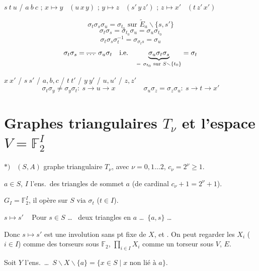 \documentclass[11pt,a4paper]{article}
\begin{document}
$s\ t\ u$ / $a\ b\ c$ ; \quad $x \mapsto y$ \ $(u\,x\,y)$ ; \quad $y \mapsto z$ \ $(s'\,y\,z')$ ; \quad $z \mapsto x'$ \ $(t\,z'\,x')$


\[
\boxed{\sigma_t\sigma_s\sigma_u = \sigma_{t_0} \text{ sur } \widetilde{E}_a \smallsetminus \{s,s'\}}
\]
\[
\sigma_t\sigma_s = \sigma_{t_0}\sigma_u = \sigma_u\sigma_{t_0}
\]
\[
\sigma_t\sigma_s\sigma_t^{-1} = \sigma_{\sigma_t s} = \sigma_u
\]
\[
\sigma_t\sigma_s = \text{\struck{\ldots}}\ \sigma_u\sigma_t \quad \text{i.e.} \quad \underbrace{\sigma_u\sigma_t\sigma_s}_{=\ \sigma_{t_0} \text{ sur } S\smallsetminus\{t_0\}} = \sigma_t
\]

$x\ x'$ / $s\ s'$ / $a,b,c$ / $t\ t'$ / $y\ y'$ / $u,u'$ / $z,z'$
\[
\sigma_t\sigma_y \neq \sigma_y\sigma_t : \ s \to u \to x \qquad\qquad \sigma_u\sigma_z = \sigma_z\sigma_u : \ s \to t \to x'
\]

\section{Graphes triangulaires $T_\nu$ et l'espace $V = \mathbb{F}_2^I$}

$*)$ \ $(S,A)$ graphe triangulaire $T_\nu$, avec  $\nu = 0, 1 \ldots 2$, $c_\nu = 2^\nu \geq 1$.

$a \in S$, $I$ l'ens.\ des triangles de sommet $a$ (de cardinal $c_\nu + 1 = 2^\nu + 1$).

\struck{\ill{}} $G_I = \mathbb{F}_2^I$, il opère sur $S$  via $\sigma_t$ ($t \in I$).


$s \mapsto s'$ \ \struck{\ill{}} Pour $s \in S$  \ldots\ \ill{} deux triangles en $a$ \ldots\ $\{a,s\}$ \ldots
{}

Donc $s \mapsto s'$ est une involution sans pt fixe de $X$, et . On peut regarder les $X_i$ ($i \in I$) comme des torseurs sous $\mathbb{F}_2$,  $\prod_{i\in I} X_i$ comme un torseur sous $V$,  $E$.

Soit $Y$ l'ens.\ \ldots\ $S \smallsetminus X \smallsetminus \{a\} = \{ x \in S \mid x \text{ non lié à } a\}$.
\end{document}
